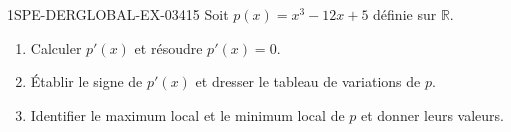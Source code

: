 \begin{exercice}{1SPE-DERGLOBAL-EX-034}{1}{5}
Soit $p(x) = x^3 - 12x + 5$ définie sur $\mathbb{R}$.
\begin{enumerate}
\item Calculer $p'(x)$ et résoudre $p'(x) = 0$.
\item Établir le signe de $p'(x)$ et dresser le tableau de variations de $p$.
\item Identifier le maximum local et le minimum local de $p$ et donner leurs valeurs.
\end{enumerate}
\end{exercice}
